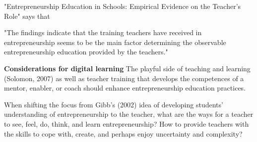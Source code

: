 "Entrepreneurship Education in Schools: Empirical Evidence on the Teacher’s Role" says that

"The findings indicate that the training teachers have received in entrepreneurship seems to be the main factor determining the observable entrepreneurship education provided by the teachers."



\textbf{Considerations for digital learning}
The playful side of teaching and learning (Solomon, 2007) as well as teacher training that develops the competences of a mentor, enabler, or coach should enhance entrepreneurship education practices.

When shifting the focus from Gibb’s (2002) idea of developing students’ understanding of entrepreneurship to the teacher, what are the ways for a teacher to see, feel, do, think, and learn entrepreneurship? How to provide teachers with the skills to cope with, create, and perhaps enjoy uncertainty and complexity?








